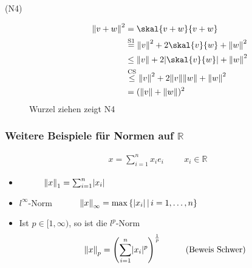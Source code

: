 \begin{description}
	\item[(N4)]\begin{align*}
		\norm{v+w}^2 &= \skal{v+w}{v+w} \\ 
		&\stackrel{\text{S1}}{=} \norm{v}^2+ 2 \skal{v}{w}+ \norm{w}^2 \\
		&\leq \norm{v} + 2 \abs{\skal{v}{w}}+ \norm{w}^2 \\
		&\stackrel{\text{CS}}{\leq} \norm{v}^2+2 \norm{v}\norm{w}+ \norm{w}^2 \\
		&=(\norm{v}+\norm{w})^2
	\end{align*} 
Wurzel ziehen zeigt N4
\bewende
\end{description}

\subsubsection{Weitere Beispiele für Normen auf $\mathbb{R}$} %
\label{ssub:weitere_beispiele_fur_normen_auf_mathbb_r}

\begin{gather*}
	 x = \sum^{n}_{i=1}x_ie_i \hspace{1cm}  x_i \in  \mathbb{R}
	 \end{gather*}
\begin{itemize}
	\item {} $\hspace{1cm}  \norm{x}_1 = \sum^{n}_{i=1}\abs{x_i}$ 
	\item $l^{\infty}$-Norm $\hspace{1cm} \norm{x}_{\infty}=\max{\{\abs{x_i}\,|\,i=1,\dots,n}\}$
	\item Ist $p \in [1,\infty)$, so ist die $l^p$-Norm
	\[
		\norm{x}_p = \left( \sum^{n}_{i=1}\abs{x_i}^p \right)^{\frac{1}{p}} \hspace{1cm} \text{(Beweis Schwer)}
	\] 
\end{itemize}

